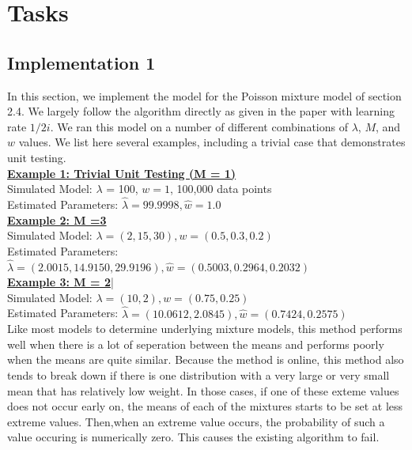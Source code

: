 \documentclass[12pt]{article}
\begin{document}
\section{Tasks}
\subsection{Implementation 1}
In this section, we implement the model for the Poisson mixture model of section 2.4. We largely follow the algorithm directly as given in the paper with learning rate $1/2i$. We ran this model on a number of different combinations of $\lambda$, $M$, and $w$ values. We list here several examples, including a trivial case that demonstrates unit testing. \\

\noindent \underline{\textbf{Example 1: Trivial Unit Testing (M = 1)} }\\ 
\indent Simulated Model: $\lambda$  = 100, $w = 1$, 100,000 data points\\
\indent Estimated Parameters: $ \hat{\lambda} = 99.9998, \hat{w} =  1.0$\\

\noindent \underline{\textbf{Example 2: M =3 }}\\
\indent Simulated Model: $\lambda = (2, 15, 30), w = (0.5, 0.3, 0.2)$\\
\indent Estimated Parameters: $\hat{\lambda} = (2.0015, 14.9150, 29.9196), \hat{w} = (0.5003, 0.2964, 0.2032)$ \\

\noindent \underline{\textbf{Example 3: M = 2}}|\\
\indent Simulated Model: $\lambda = (10,2), w = (0.75, 0.25)$\\
\indent Estimated Parameters: $\hat{\lambda} = (10.0612, 2.0845), \hat{w} = ( 0.7424, 0.2575) $ \\

\noindent Like most models to determine underlying mixture models, this method performs well when there is a lot of seperation between the means and performs poorly when the means are quite similar. Because the method is online, this method also tends to break down if there is one  distribution with a very large or very small mean that has relatively low weight. In those cases, if one of these exteme values does not occur early on, the means of each of the mixtures starts to be set at less extreme values. Then,when an extreme value occurs, the probability of such a value occuring is numerically zero. This causes the existing algorithm to fail. 
\end{document}
